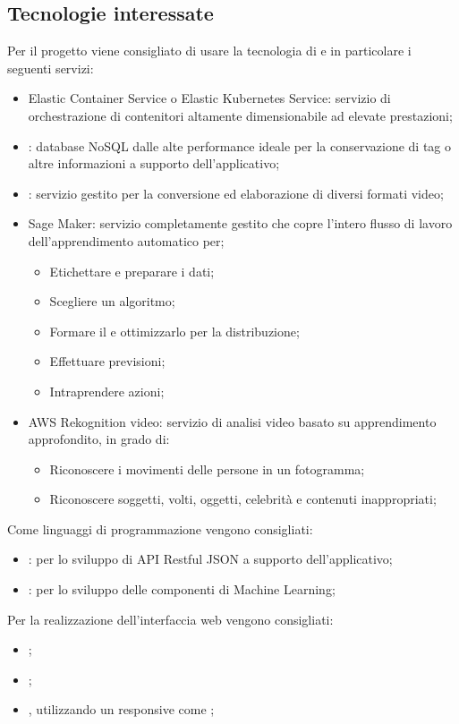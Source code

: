 \documentclass[../studio-di-fattibilita.tex]{subfiles}
\begin{document}
\subsection{Tecnologie interessate}%
\label{sub:tecnologie_interessate}
Per il progetto viene consigliato di usare la tecnologia di  e in particolare i seguenti servizi:
\begin{itemize}
  \item Elastic  Container  Service  o  Elastic  Kubernetes  Service: servizio  di  orchestrazione  di  contenitori  altamente  dimensionabile  ad  elevate prestazioni;
  \item {}: database NoSQL dalle alte performance ideale per la conservazione di tag o altre informazioni a supporto dell'applicativo;
  \item {}: servizio gestito per la conversione ed elaborazione di diversi formati video;
  \item Sage Maker: servizio completamente gestito che copre l'intero flusso di lavoro dell'apprendimento automatico per;
  \begin{itemize}
    \item Etichettare e preparare i dati;
    \item Scegliere un algoritmo;
    \item Formare il  e ottimizzarlo per la distribuzione;
    \item Effettuare previsioni;
    \item Intraprendere azioni;
  \end{itemize} 
  \item AWS Rekognition video: servizio di analisi video basato su apprendimento approfondito, in grado di:
  \begin{itemize}
    \item Riconoscere i movimenti delle persone in un fotogramma;
    \item Riconoscere soggetti, volti, oggetti, celebrità e contenuti inappropriati;
  \end{itemize} 
\end{itemize}
Come linguaggi di programmazione vengono consigliati:
\begin{itemize}
    \item {}: per lo sviluppo di API Restful JSON a supporto dell’applicativo;
    \item {}: per lo sviluppo delle componenti di Machine Learning;
\end{itemize}
Per la realizzazione dell'interfaccia web vengono consigliati:
\begin{itemize}
  \item {};
  \item {};
  \item {}, utilizzando un  responsive come ;
\end{itemize}
\end{document}
